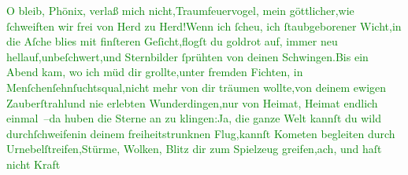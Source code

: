            \stanza{}\textcolor{green}{O bleib, Phönix, verlaß mich nicht,}{}\ledrightnote{\textcolor{green}{Das Haus des Dichters}}\newverse{}\textcolor{green}{Traumfeuervogel, mein göttlicher,}{}\ledrightnote{\textcolor{green}{Das Haus des Dichters}}\newverse{}\textcolor{green}{wie ſchweiften wir frei von Herd zu Herd!}{}\ledrightnote{\textcolor{green}{Das Haus des Dichters}}\newverse{}\textcolor{green}{Wenn ich ſcheu, ich ſtaubgeborener Wicht,}{}\ledrightnote{\textcolor{green}{Das Haus des Dichters}}\newverse{}\textcolor{green}{in die Aſche blies mit finſteren Geſicht,}{}\ledrightnote{\textcolor{green}{Das Haus des Dichters}}\newverse{}\textcolor{green}{flogſt du goldrot auf, immer neu hellauf,}{}\ledrightnote{\textcolor{green}{Das Haus des Dichters}}\newverse{}\textcolor{green}{unbeſchwert,}{}\ledrightnote{\textcolor{green}{Das Haus des Dichters}}\newverse{}\textcolor{green}{und Sternbilder ſprühten von deinen Schwingen.}{}\ledrightnote{\textcolor{green}{Das Haus des Dichters}}\newverse{}\textcolor{green}{Bis ein Abend kam, wo ich müd dir grollte,}{}\ledrightnote{\textcolor{green}{Das Haus des Dichters}}\newverse{}\textcolor{green}{unter fremden Fichten, in
                     Menſchenſehnſuchtsqual,}{}\ledrightnote{\textcolor{green}{Das Haus des Dichters}}\newverse{}\textcolor{green}{nicht mehr von dir träumen wollte,}{}\ledrightnote{\textcolor{green}{Das Haus des Dichters}}\newverse{}\textcolor{green}{von deinem ewigen Zauberſtrahl}{}\ledrightnote{\textcolor{green}{Das Haus des Dichters}}\newverse{}\textcolor{green}{und nie erlebten Wunderdingen,}{}\ledrightnote{\textcolor{green}{Das Haus des Dichters}}\newverse{}\textcolor{green}{nur von Heimat, Heimat endlich einmal –}{}\ledrightnote{\textcolor{green}{Das Haus des Dichters}}\newverse{}\textcolor{green}{da huben die Sterne an zu klingen:}{}\ledrightnote{\textcolor{green}{Das Haus des Dichters}}\newverse{}\textcolor{green}{Ja, die ganze Welt kannſt du wild durchſchweifen}{}\ledrightnote{\textcolor{green}{Das Haus des Dichters}}\newverse{}\textcolor{green}{in deinem freiheitstrunknen Flug,}{}\ledrightnote{\textcolor{green}{Das Haus des Dichters}}\newverse{}\textcolor{green}{kannſt Kometen begleiten durch Urnebelſtreifen,}{}\ledrightnote{\textcolor{green}{Das Haus des Dichters}}\newverse{}\textcolor{green}{Stürme, Wolken, Blitz dir zum Spielzeug greifen,}{}\ledrightnote{\textcolor{green}{Das Haus des Dichters}}\newverse{}\textcolor{green}{{\pb}ach, und haſt nicht Kraft
}
